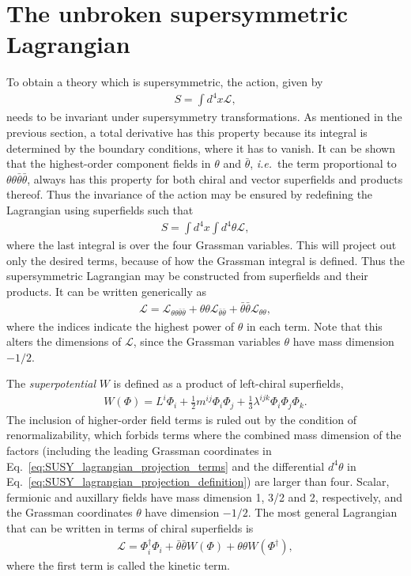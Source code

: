 \documentclass[twoside,english]{uiofysmaster}
\begin{document}
\section{The unbroken supersymmetric Lagrangian}
\label{sec:unbroken_susy}
To obtain a theory which is supersymmetric, the action, given by
\begin{align}
 	S = \int d^4 x \mathcal{L},
 \end{align}
 needs to be invariant under supersymmetry transformations. As mentioned in the previous section, a total derivative has this property because its integral is determined by the boundary conditions, where it has to vanish. It can be shown that the highest-order component fields in $\theta$ and $\bar \theta$, {\it i.e.}\ the term proportional to $\theta\theta\bar\theta\bar\theta$, always has this property for both chiral and vector superfields and products thereof. Thus the invariance of the action may be ensured by redefining the Lagrangian using superfields such that
 \begin{align}
 	S = \int d^4 x \int d^4 \theta \mathcal{L},\label{eq:SUSY_lagrangian_projection_definition}
 \end{align}
 where the last integral is over the four Grassman variables. This will project out only the desired terms, because of how the Grassman integral is defined. Thus the supersymmetric Lagrangian may be constructed from superfields and their products. It can be written generically as
 \begin{align}
 	\mathcal{L} = \mathcal{L}_{\theta\theta \bar\theta \bar\theta} + \theta \theta \mathcal{L}_{\bar\theta \bar\theta} + \bar\theta \bar\theta \mathcal{L}_{\theta \theta},\label{eq:SUSY_lagrangian_projection_terms}
 \end{align}
 where the indices indicate the highest power of $\theta$ in each term. Note that this alters the dimensions of $\mathcal{L}$, since the Grassman variables $\theta$ have mass dimension $-1/2$.

The {\it superpotential} $W$ is defined as a product of left-chiral superfields,
 \begin{align}
 	W(\Phi) = L^i\Phi_i + \frac{1}{2}m^{ij}\Phi_i\Phi_j + \frac{1}{3}\lambda^{ijk}\Phi_i\Phi_j\Phi_k.
 \end{align}
The inclusion of higher-order field terms is ruled out by the condition of renormalizability, which forbids terms where the combined mass dimension of the factors (including the leading Grassman coordinates in Eq.\ \ref{eq:SUSY_lagrangian_projection_terms} and the differential $d^4\theta$ in Eq.\ \ref{eq:SUSY_lagrangian_projection_definition}) are larger than four. Scalar, fermionic and auxillary fields have mass dimension 1, 3/2 and 2, respectively, and the Grassman coordinates $\theta$ have dimension $-1/2$. The most general Lagrangian that can be written in terms of chiral superfields is
\begin{align}
	\mathcal{L} = \Phi_i^\dag \Phi_i + \bar\theta\bar\theta W(\Phi) + \theta\theta W(\Phi^\dag),
\end{align}
where the first term is called the kinetic term. 
\end{document}
